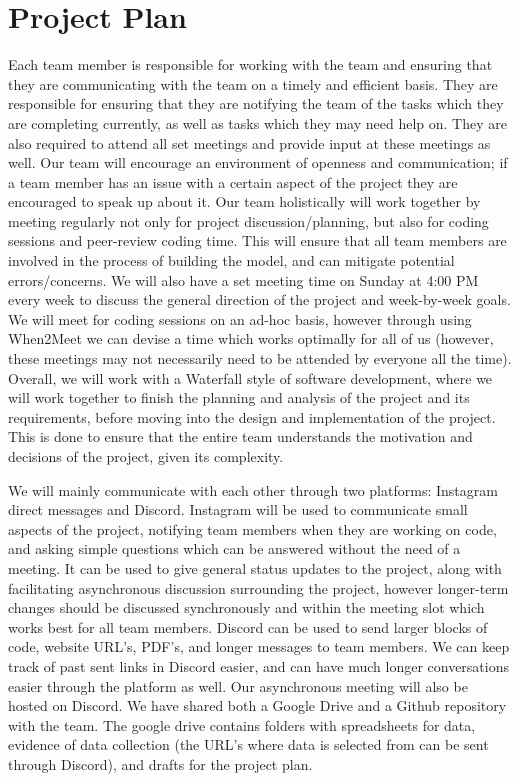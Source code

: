 \documentclass{article} %
\begin{document}
\section {Project Plan}
Each team member is responsible for working with the team and ensuring that they are communicating with the team on a timely and efficient basis. They are responsible for ensuring that they are notifying the team of the tasks which they are completing currently, as well as tasks which they may need help on. They are also required to attend all set meetings and provide input at these meetings as well. Our team will encourage an environment of openness and communication; if a team member has an issue with a certain aspect of the project they are encouraged to speak up about it. Our team holistically will work together by meeting regularly not only for project discussion/planning, but also for coding sessions and peer-review coding time. This will ensure that all team members are involved in the process of building the model, and can mitigate potential errors/concerns. We will also have a set meeting time on Sunday at 4:00 PM every week to discuss the general direction of the project and week-by-week goals. We will meet for coding sessions on an ad-hoc basis, however through using When2Meet we can devise a time which works optimally for all of us (however, these meetings may not necessarily need to be attended by everyone all the time).  Overall, we will work with a Waterfall style of software development, where we will work together to finish the planning and analysis of the project and its requirements, before moving into the design and implementation of the project. This is done to ensure that the entire team understands the motivation and decisions of the project, given its complexity. 

We will mainly communicate with each other through two platforms: Instagram direct messages and Discord. Instagram will be used to communicate small aspects of the project, notifying team members when they are working on code, and asking simple questions which can be answered without the need of a meeting. It can be used to give general status updates to the project, along with facilitating asynchronous discussion surrounding the project, however longer-term changes should be discussed synchronously and within the meeting slot which works best for all team members. Discord can be used to send larger blocks of code, website URL’s, PDF’s, and longer messages to team members. We can keep track of past sent links in Discord easier, and can have much longer conversations easier through the platform as well. Our asynchronous meeting will also be hosted on Discord. We have shared both a Google Drive and a Github repository with the team. The google drive contains folders with spreadsheets for data, evidence of data collection (the URL’s where data is selected from can be sent through Discord), and drafts for the project plan. 
\end{document}
